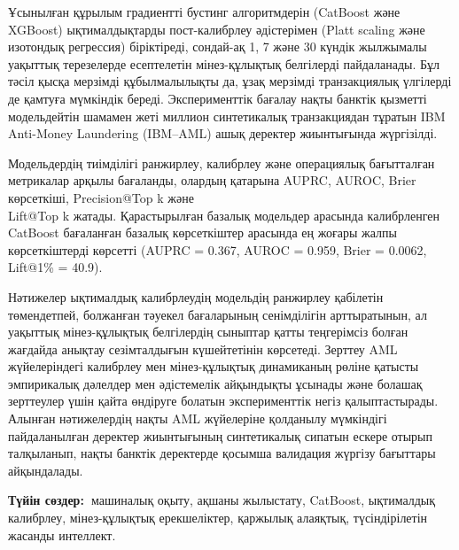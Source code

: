 Ұсынылған құрылым градиентті бустинг алгоритмдерін (CatBoost және
XGBoost) ықтималдықтарды пост-калибрлеу әдістерімен (Platt scaling және
изотондық регрессия) біріктіреді, сондай-ақ 1, 7 және 30 күндік
жылжымалы уақыттық терезелерде есептелетін мінез-құлықтық белгілерді
пайдаланады. Бұл тәсіл қысқа мерзімді құбылмалылықты да, ұзақ мерзімді
транзакциялық үлгілерді де қамтуға мүмкіндік береді. Эксперименттік
бағалау нақты банктік қызметті модельдейтін шамамен жеті миллион
синтетикалық транзакциядан тұратын IBM Anti-Money Laundering (IBM--AML)
ашық деректер жиынтығында жүргізілді.

Модельдердің тиімділігі ранжирлеу, калибрлеу және операциялық
бағытталған метрикалар арқылы бағаланды, олардың қатарына AUPRC, AUROC,
Brier көрсеткіші, Precision@Top k және \\Lift@Top k жатады. Қарастырылған
базалық модельдер арасында калибрленген CatBoost бағалан\-ған базалық
көрсеткіштер арасында ең жоғары жалпы көрсеткіштерді көрсетті (AUPRC =
0.367, AUROC = 0.959, Brier = 0.0062, Lift@1\% = 40.9).

Нәтижелер ықтималдық калибрлеудің модельдің ранжирлеу қабілетін
төмендетпей, болжанған тәуекел бағаларының сенімділігін арттыратынын, ал
уақыттық мінез-құлықтық белгілердің сыныптар қатты теңгерімсіз болған
жағдайда анықтау сезімталдығын күшейтетінін көрсетеді. Зерттеу AML
жүйелеріндегі калибрлеу мен мінез-құлықтық динамиканың рөліне қатысты
эмпирикалық дәлелдер мен әдістемелік айқындықты ұсынады және болашақ
зерттеулер үшін қайта өндіруге болатын эксперименттік негіз
қалыптастырады. Алынған нәтижелердің нақты AML жүйелеріне қолданылу
мүмкіндігі пайдаланылған деректер жиынтығының синтетикалық сипатын
ескере отырып талқыланып, нақты банктік деректерде қосымша валидация
жүргізу бағыттары айқындалады.

{\bfseries Түйін сөздер:~}машиналық оқыту, ақшаны жылыстату, CatBoost,
ықтималдық калибрлеу, мінез-құлықтық ерекшеліктер, қаржылық алаяқтық,
түсіндірілетін жасанды интеллект.


